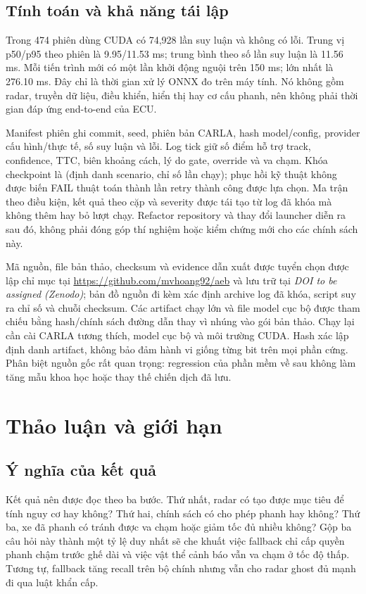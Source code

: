 \documentclass[conference]{IEEEtran}
\newcommand{\artifactdoi}{\textit{DOI to be assigned (Zenodo)}}
\begin{document}
\subsection{Tính toán và khả năng tái lập}
Trong 474 phiên dùng CUDA có 74,928 lần suy luận và không có lỗi. Trung vị
p50/p95 theo phiên là 9.95/11.53 ms; trung bình theo số lần suy luận là
11.56 ms. Mỗi tiến trình mới có một lần khởi động nguội trên 150 ms; lớn nhất
là 276.10 ms. Đây chỉ là thời gian xử lý ONNX đo trên máy tính. Nó không gồm
radar, truyền dữ liệu, điều khiển, hiển thị hay cơ cấu phanh, nên không phải
thời gian đáp ứng end-to-end của ECU.

Manifest phiên ghi commit, seed, phiên bản CARLA, hash model/config, provider
cấu hình/thực tế, số suy luận và lỗi. Log tick giữ số điểm hỗ trợ track,
confidence, TTC, biên khoảng cách, lý do gate, override và va chạm. Khóa
checkpoint là (định danh scenario, chỉ số lần chạy); phục hồi kỹ thuật không
được biến FAIL thuật toán thành lần retry thành công được lựa chọn.
Ma trận theo điều kiện, kết quả theo cặp và severity được tái tạo từ log đã
khóa mà không thêm hay bỏ lượt chạy. Refactor repository và thay đổi
launcher diễn ra sau đó, không phải đóng góp thí nghiệm hoặc kiểm chứng mới
cho các chính sách này.

Mã nguồn, file bản thảo, checksum và evidence dẫn xuất được tuyển chọn được lập
chỉ mục tại \url{https://github.com/mvhoang92/aeb} và lưu trữ tại \artifactdoi;
bản đồ nguồn đi kèm xác định
archive log đã khóa, script suy ra chỉ số và chuỗi checksum. Các artifact chạy
lớn và file model cục bộ được tham chiếu bằng hash/chính sách đường dẫn thay vì
nhúng vào gói bản thảo. Chạy lại cần cài CARLA tương thích, model cục bộ và môi
trường CUDA. Hash xác lập định danh artifact,
không bảo đảm hành vi giống từng bit trên mọi phần cứng. Phân biệt nguồn
gốc rất quan trọng: regression của phần mềm về sau không làm tăng mẫu
khoa học hoặc thay thế chiến dịch đã lưu.

\section{Thảo luận và giới hạn}
\subsection{Ý nghĩa của kết quả}
Kết quả nên được đọc theo ba bước. Thứ nhất, radar có tạo được mục tiêu để
tính nguy cơ hay không? Thứ hai, chính sách có cho phép phanh hay không?
Thứ ba, xe đã phanh có tránh được va chạm hoặc giảm tốc đủ nhiều không?
Gộp ba câu hỏi này thành một tỷ lệ duy nhất sẽ che khuất việc fallback chỉ
cấp quyền phanh chậm trước ghế dài và việc vật thể cảnh báo vẫn va chạm ở tốc độ thấp.
Tương tự, fallback tăng recall trên bộ chính nhưng vẫn cho radar ghost đủ
mạnh đi qua luật khẩn cấp.
\end{document}
